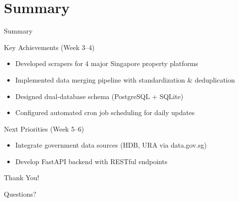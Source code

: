 \documentclass[aspectratio=169,10pt]{beamer}
\begin{document}
\section{Summary}

\begin{frame}{Summary}
    \begin{block}{Key Achievements (Week 3--4)}
        \begin{itemize}
            \item Developed scrapers for 4 major Singapore property platforms
            \item Implemented data merging pipeline with standardization \& deduplication
            \item Designed dual-database schema (PostgreSQL + SQLite)
            \item Configured automated cron job scheduling for daily updates
        \end{itemize}
    \end{block}
    
    \vspace{0.3cm}
    
    \begin{block}{Next Priorities (Week 5--6)}
        \begin{itemize}
            \item Integrate government data sources (HDB, URA via data.gov.sg)
            \item Develop FastAPI backend with RESTful endpoints
        \end{itemize}
    \end{block}
\end{frame}

\begin{frame}
    \begin{center}
        \Huge Thank You!
        
        \vspace{1cm}
        
        \Large Questions?
    \end{center}
\end{frame}
\end{document}
